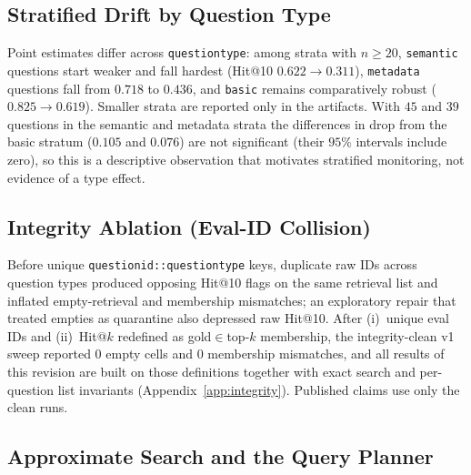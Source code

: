 \documentclass{ieeeaccess}
\makeatletter
\DeclareRobustCommand{\_}{\ifmmode\nfss@text{\textunderscore}\else\textunderscore\allowbreak\fi}
\makeatother
\begin{document}



\subsection{Stratified Drift by Question Type}
\label{sec:bytype}
Point estimates differ across \texttt{question\_type}: among strata with $n{\ge}20$, \texttt{semantic} questions start weaker and fall hardest (Hit@10 $0.622{\to}0.311$), \texttt{metadata} questions fall from $0.718$ to $0.436$, and \texttt{basic} remains comparatively robust ($0.825{\to}0.619$). Smaller strata are reported only in the artifacts. With $45$ and $39$ questions in the semantic and metadata strata the differences in drop from the basic stratum ($0.105$ and $0.076$) are not significant (their $95\%$ intervals include zero), so this is a descriptive observation that motivates stratified monitoring, not evidence of a type effect.

\subsection{Integrity Ablation (Eval-ID Collision)}
Before unique \texttt{question\_id::question\_type} keys, duplicate raw IDs across question types produced opposing Hit@10 flags on the same retrieval list and inflated empty-retrieval and membership mismatches; an exploratory repair that treated empties as quarantine also depressed raw Hit@10. After (i)~unique eval IDs and (ii)~Hit@$k$ redefined as gold$\in$top-$k$ membership, the integrity-clean v1 sweep reported $0$ empty cells and $0$ membership mismatches, and all results of this revision are built on those definitions together with exact search and per-question list invariants (Appendix~\ref{app:integrity}). Published claims use only the clean runs.

\subsection{Approximate Search and the Query Planner}
\label{sec:planner}
\end{document}
